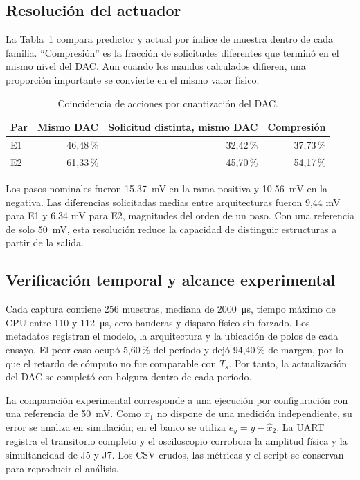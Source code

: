 \subsection{Resolución del actuador}
La Tabla~\ref{tab:cuantizacion} compara predictor y actual por índice de muestra
dentro de cada familia. ``Compresión'' es la fracción de solicitudes diferentes
que terminó en el mismo nivel del DAC. Aun cuando los mandos calculados difieren,
una proporción importante se convierte en el mismo valor físico.

\begin{table}[t]
\centering
\caption{Coincidencia de acciones por cuantización del DAC.}
\label{tab:cuantizacion}
\small
\begin{tabular}{@{}lrrr@{}}
\toprule
Par & Mismo DAC & Solicitud distinta, mismo DAC & Compresión\\
\midrule
E1 & 46,48\,\% & 32,42\,\% & 37,73\,\%\\
E2 & 61,33\,\% & 45,70\,\% & 54,17\,\%\\
\bottomrule
\end{tabular}
\end{table}

Los pasos nominales fueron \SI{15.37}{\milli\volt} en la rama positiva y
\SI{10.56}{\milli\volt} en la negativa. Las diferencias solicitadas medias
entre arquitecturas fueron 9,44 mV para E1 y 6,34 mV para E2, magnitudes del
orden de un paso. Con una referencia de solo \SI{50}{\milli\volt}, esta
resolución reduce la capacidad de distinguir estructuras a partir de la salida.

\subsection{Verificación temporal y alcance experimental}
Cada captura contiene 256 muestras, mediana de
\SI{2000}{\micro\second}, tiempo máximo de CPU entre 110 y
\SI{112}{\micro\second}, cero banderas y disparo físico sin forzado. Los
metadatos registran el modelo, la arquitectura y la ubicación de polos de cada
ensayo. El peor caso ocupó 5,60\,\% del período y dejó 94,40\,\% de
margen, por lo que el retardo de cómputo no fue comparable con $T_s$. Por tanto,
la actualización del DAC se completó con holgura dentro de cada período.

La comparación experimental corresponde a una ejecución por configuración con
una referencia de \SI{50}{\milli\volt}. Como $x_1$ no dispone de una medición
independiente, su error se analiza en simulación; en el banco se utiliza
$e_y=y-\hat x_2$. La UART registra el transitorio completo y el osciloscopio
corrobora la amplitud física y la simultaneidad de J5 y J7. Los CSV crudos, las
métricas y el script se conservan para reproducir el análisis.
